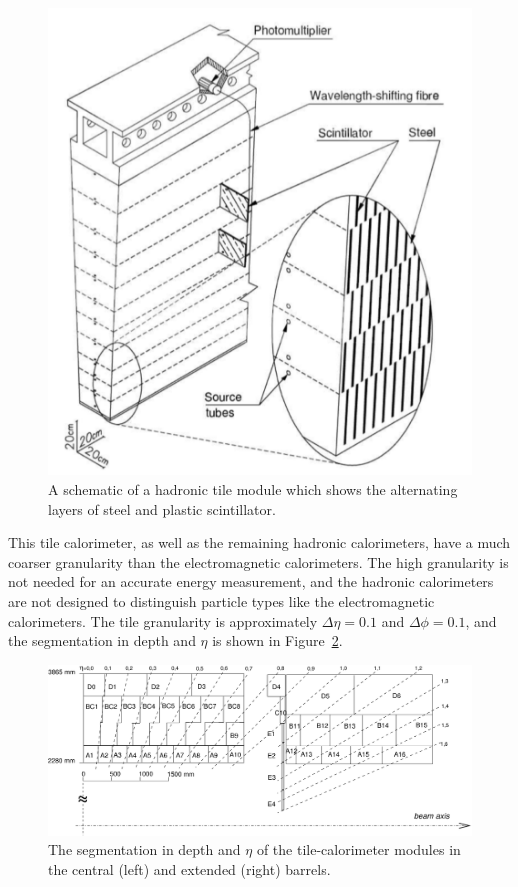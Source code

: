 \begin{figure}[hbtp]
\includegraphics[width=\fullfig]{figures/hadronic_tile.png}
\caption{A schematic of a hadronic tile module which shows the alternating layers of steel and plastic scintillator.}
\label{fig:hadronic_tile.png}
\end{figure}

This tile calorimeter, as well as the remaining hadronic calorimeters, have a much coarser granularity than the electromagnetic calorimeters.
The high granularity is not needed for an accurate energy measurement, and the hadronic calorimeters are not designed to distinguish particle types like the electromagnetic calorimeters.
The tile granularity is approximately $\Delta\eta = 0.1$ and $\Delta\phi = 0.1$, and the segmentation in depth and $\eta$ is shown in Figure~\ref{fig:tile_segmentation}.

\begin{figure}[hbtp]
\includegraphics[width=\fullfig]{figures/tile_segmentation.pdf}
\caption{The segmentation in depth and $\eta$ of the tile-calorimeter modules in the central (left) and extended (right) barrels.}
\label{fig:tile_segmentation}
\end{figure}

